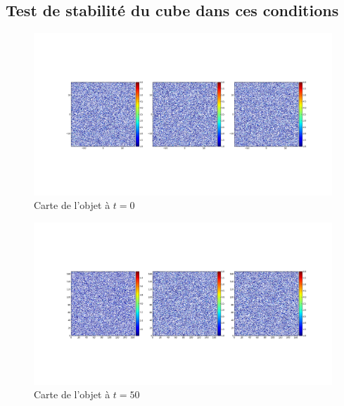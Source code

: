 \subsection{Test de stabilité du cube dans ces conditions}
	\begin{figure}
		\begin{center}
			\includegraphics[width=\textwidth]{graphe/dc.png}
			\caption{Carte de l'objet à $t=0$}
			\label{simu::graphe::dccarte0}
		\end{center}
	\end{figure}
	\begin{figure}
		\begin{center}
			\includegraphics[width=\textwidth]{graphe/dc500.png}
			\caption{Carte de l'objet à $t=50$}
			\label{simu::graphe::dccarte50}
		\end{center}
	\end{figure}

